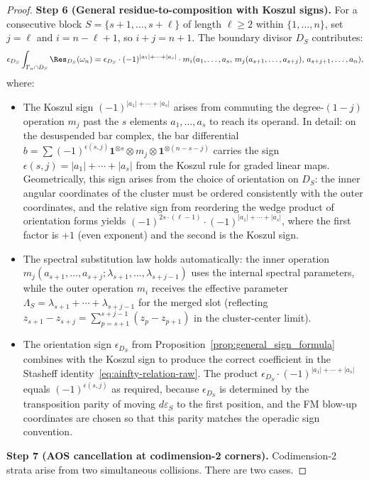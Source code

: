 \begin{proof}
\medskip
\textbf{Step 6 (General residue-to-composition with Koszul signs).}
For a consecutive block $S = \{s{+}1,\ldots,s{+}\ell\}$ of length $\ell \geq 2$ within $\{1,\ldots,n\}$, set $j = \ell$ and $i = n - \ell + 1$, so $i + j = n + 1$. The boundary divisor $D_S$ contributes:
\[
\epsilon_{D_S} \int_{\Gamma_n \cap D_S} \Res_{D_S}(\omega_n)
= \epsilon_{D_S} \cdot (-1)^{|a_1|+\cdots+|a_s|}
\cdot m_i(a_1,\ldots,a_s,\, m_j(a_{s+1},\ldots,a_{s+j}),\, a_{s+j+1},\ldots,a_n),
\]
where:
\begin{itemize}
\item The Koszul sign $(-1)^{|a_1|+\cdots+|a_s|}$ arises from commuting the degree-$(1{-}j)$ operation $m_j$ past the $s$ elements $a_1,\ldots,a_s$ to reach its operand. In detail: on the desuspended bar complex, the bar differential $b = \sum (-1)^{\epsilon(s,j)} \mathbf{1}^{\otimes s} \otimes m_j \otimes \mathbf{1}^{\otimes (n-s-j)}$ carries the sign $\epsilon(s,j) = |a_1| + \cdots + |a_s|$ from the Koszul rule for graded linear maps. Geometrically, this sign arises from the choice of orientation on $D_S$: the inner angular coordinates of the cluster must be ordered consistently with the outer coordinates, and the relative sign from reordering the wedge product of orientation forms yields $(-1)^{2s \cdot (\ell-1)} \cdot (-1)^{|a_1|+\cdots+|a_s|}$, where the first factor is $+1$ (even exponent) and the second is the Koszul sign.
\item The spectral substitution law holds automatically: the inner operation $m_j(a_{s+1},\ldots,a_{s+j};\lambda_{s+1},\ldots,\lambda_{s+j-1})$ uses the internal spectral parameters, while the outer operation $m_i$ receives the effective parameter $\Lambda_S = \lambda_{s+1} + \cdots + \lambda_{s+j-1}$ for the merged slot (reflecting $z_{s+1} - z_{s+j} = \sum_{p=s+1}^{s+j-1}(z_p - z_{p+1})$ in the cluster-center limit).
\item The orientation sign $\epsilon_{D_S}$ from Proposition~\ref{prop:general_sign_formula} combines with the Koszul sign to produce the correct coefficient in the Stasheff identity~\eqref{eq:ainfty-relation-raw}. The product $\epsilon_{D_S} \cdot (-1)^{|a_1|+\cdots+|a_s|}$ equals $(-1)^{\epsilon(s,j)}$ as required, because $\epsilon_{D_S}$ is determined by the transposition parity of moving $d\varepsilon_S$ to the first position, and the FM blow-up coordinates are chosen so that this parity matches the operadic sign convention.
\end{itemize}

\medskip
\textbf{Step 7 (AOS cancellation at codimension-2 corners).}
Codimension-2 strata arise from two simultaneous collisions. There are two cases.


\end{proof}
